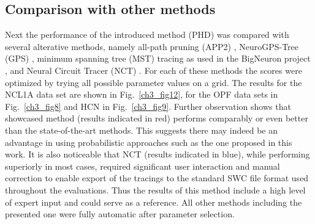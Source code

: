 \subsection{Comparison with other methods}
\label{subsec:comparison-with-other-methods}
Next the performance of the introduced method (PHD) was compared with several alterative methods, namely all-path pruning (APP2) \cite{xiao2013app2}, NeuroGPS-Tree (GPS) \cite{quan2016neurogps}, minimum spanning tree (MST) tracing as used in the BigNeuron project \cite{peng2015bigneuron}, and Neural Circuit Tracer (NCT) \cite{chothani2011automated}. For each of these methods the scores were optimized by trying all possible parameter values on a grid. The results for the NCL1A data set are shown in Fig.~\ref{ch3_fig12}, for the OPF data sets in Fig.~\ref{ch3_fig8} and HCN in Fig.~\ref{ch3_fig9}. Further observation shows that showcased method (results indicated in red) performs comparably or even better than the state-of-the-art methods. This suggests there may indeed be an advantage in using probabilistic approaches such as the one proposed in this work. It is also noticeable that NCT (results indicated in blue), while performing superiorly in most cases, required significant user interaction and manual correction to enable export of the tracings to the standard SWC file format used throughout the evaluations. Thus the results of this method include a high level of expert input and could serve as a reference. All other methods including the presented one were fully automatic after parameter selection.
